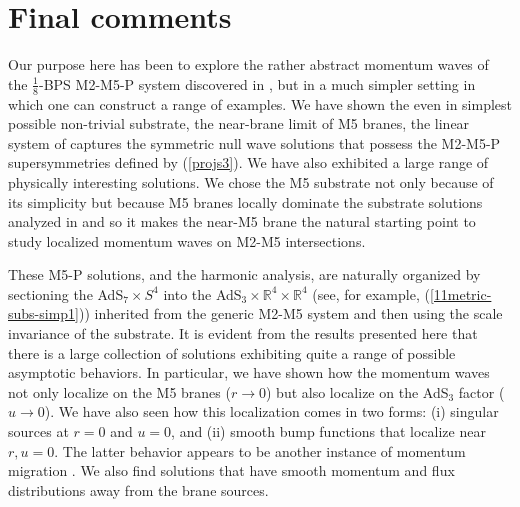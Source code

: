 \documentclass[11pt]{article}
\def\IR{\mathbb{R}}
\def\nBPS#1{$\frac{1}{#1}$-BPS}
\numberwithin{equation}{section}
\begin{document}
%
\section{Final comments}
\label{sec:Conclusions}


Our purpose here has been to explore the rather abstract momentum waves of the \nBPS{8}  M2-M5-P  system discovered in \cite{Bena:2024qed}, but in a much simpler setting in which one can construct a range of examples. We have shown the even in simplest possible non-trivial substrate, the near-brane limit of M5 branes, the linear system of \cite{Bena:2024qed} captures the symmetric null wave solutions that possess the M2-M5-P supersymmetries  defined by (\ref{projs3}).  We have also exhibited a large range of physically interesting solutions.  We chose the  M5 substrate not only because of its simplicity but because M5 branes locally dominate the substrate solutions analyzed in \cite{Bena:2023rzm,Bena:2024qed,Bena:2024dre,Bena:2025hxt} and so it makes the near-M5 brane the natural starting point to study localized momentum waves on M2-M5 intersections. 

These M5-P solutions, and the harmonic analysis,  are naturally organized by  sectioning the AdS$_7 \times S^4$  into the AdS$_3 \times \IR^4 \times \IR^4$  (see, for example,  (\ref{11metric-subs-simp1})) inherited from the generic M2-M5 system and then using the scale invariance of the substrate.  It is evident from the results presented here that there is a large collection of  solutions exhibiting quite a range of possible asymptotic behaviors.  In particular, we have shown how the momentum waves  not only localize on the M5 branes ($r \to 0$) but also localize on the AdS$_3$ factor ($u \to 0$).  We have also seen how this localization comes in two forms: (i) singular sources at  $r= 0$ and  $u = 0$, and (ii)  smooth bump functions that localize near $r,u= 0$.   The latter behavior appears to be another instance of momentum migration \cite{Bena:2025uyg}.  We also find solutions that have smooth momentum and flux distributions away from the brane sources.
\end{document}
